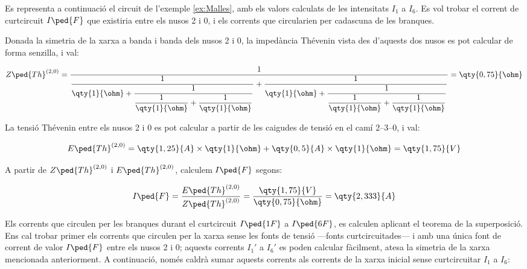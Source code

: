 \begin{exemple}\label{ex:CurtcircuitXarxaSenzilla}
	\addcontentsxms{\CurtcircuitXarxaSenzilla}	
	Es representa a continuació el circuit de l'exemple \vref{ex:Malles}, amb els valors calculats de les intensitats $I_1$ a $I_6$. Es vol trobar el corrent de curtcircuit $I\ped{F}$ que existiria entre els nusos 2 i 0, i els corrents que circularien per cadascuna de les branques.
	
	\begin{center}
		
	\end{center}
	
	Donada la simetria de la xarxa  a banda i banda dels nusos 2 i 0, la impedància Thévenin vista des d'aquests dos nusos es pot calcular de forma senzilla, i val:

	\[
	Z\ped{Th}^{(2,0)} = \dfrac{1}{\dfrac{1}{\qty{1}{\ohm}+\dfrac{1}{\dfrac{1}{\qty{1}{\ohm}}+\dfrac{1}{\qty{1}{\ohm}}}}+\dfrac{1}{\qty{1}{\ohm}+\dfrac{1}{\dfrac{1}{\qty{1}{\ohm}}+\dfrac{1}{\qty{1}{\ohm}}}}} = \qty{0,75}{\ohm}
	\]
	
	La tensió Thévenin entre els nusos 2 i 0 es pot calcular a partir de les caigudes de tensió en el camí 2--3--0, i val:

	\[
	E\ped{Th}^{(2,0)} = \qty{1,25}{A} \times \qty{1}{\ohm} + \qty{0,5}{A} \times \qty{1}{\ohm} = \qty{1,75}{V}
	\]
	
	
	A partir de $Z\ped{Th}^{(2,0)}$ i $E\ped{Th}^{(2,0)}$, calculem $I\ped{F}$ segons:

	\[
	I\ped{F} = \frac{E\ped{Th}^{(2,0)}}{Z\ped{Th}^{(2,0)}} = \frac{\qty{1,75}{V}}{\qty{0,75}{\ohm}} = \qty{2,333}{A}
	\]
	
	Els corrents que circulen per les branques durant el curtcircuit  $I\ped{1F}$ a $I\ped{6F}$, es calculen aplicant el teorema de la superposició. Ens cal trobar primer els corrents que circulen per la xarxa sense les fonts de tensió ---fonts curtcircuitades--- i amb una única font de corrent de valor  $I\ped{F}$ entre els nusos 2 i 0; aquests corrents $I_1'$ a $I_6'$ es poden calcular fàcilment, atesa la simetria de la xarxa mencionada anteriorment. A continuació, només caldrà sumar aquests corrents als corrents de la xarxa inicial sense curtcircuitar $I_1$ a $I_6$:


\end{exemple}
